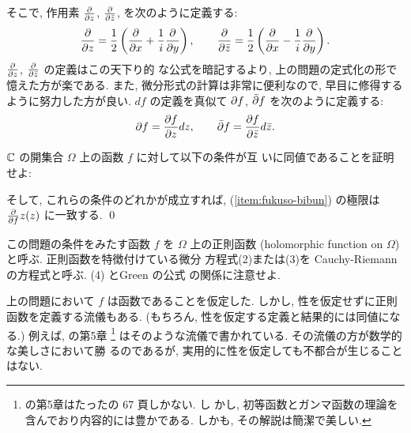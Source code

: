 \documentclass[12pt,twoside]{jarticle}
\begin{document}
\noindent そこで, 作用素 $\frac{\partial}{\partial z}$,
$\frac{\partial}{\partial\bar{z}}$, を次のように定義する:
\[
  \frac{\partial}{\partial z} =
  \frac{1}{2}
  \left( \frac{\partial}{\partial x} + \frac{1}{i} \frac{\partial}{\partial y} \right),
  \qquad
  \frac{\partial}{\partial\bar z} =
  \frac{1}{2}
  \left( \frac{\partial}{\partial x} - \frac{1}{i} \frac{\partial}{\partial y} \right).
\]%
$\frac{\partial}{\partial z}$, $\frac{\partial}{\partial\bar{z}}$ の定義はこの天下り的
な公式を暗記するより, 上の問題の定式化の形で憶えた方が楽である. また, 
微分形式の計算は非常に便利なので, 早目に修得するように努力した方が良い. 
$df$ の定義を真似て $\partial f$, ${\bar\partial} f$ を次のように定義する:
\[
  \partial f = \frac{\partial f}{\partial z}dz,
  \qquad
  {\bar\partial} f = \frac{\partial f}{\partial\bar z}d\bar{z}.
\]%


\begin{question}\label{q:seisoku-kansu}
  ${\mathbb C}$ の開集合 $\Omega$ 上の函数 $f$ に対して以下の条件が互
  いに同値であることを証明せよ:
  そして, これらの条件のどれかが成立すれば, (\ref{item:fukuso-bibun})
  の極限は $\frac{\partial}{\partial f}{z}(z)$ に一致する. 
  \qed
\end{question}

\noindent この問題の条件をみたす函数 $f$ を $\Omega$ 上の正則函数
(holomorphic function on $\Omega$)と呼ぶ. 正則函数を特徴付けている微分
方程式(2)または(3)を Cauchy-Riemann の方程式と呼ぶ. (4) とGreen の公式
の関係に注意せよ.


上の問題において $f$ は函数であることを仮定した. しかし,
性を仮定せずに正則函数を定義する流儀もある. (もちろん,
性を仮定する定義と結果的には同値になる.) 例えば,
\cite{kaiseki-gairon} の第5章%
\footnote{\cite{kaiseki-gairon} の第5章はたったの 67 頁しかない. し
  かし, 初等函数とガンマ函数の理論を含んでおり内容的には豊かである. 
  しかも, その解説は簡潔で美しい.}
%
はそのような流儀で書かれている. その流儀の方が数学的な美しさにおいて勝
るのであるが, 実用的に性を仮定しても不都合が生じることはない.
\end{document}
